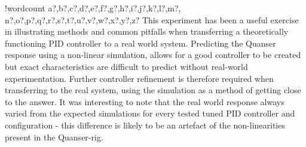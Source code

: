 \documentclass[11pt]{article}
\newcounter{words}
\newenvironment{counted}{%
  \setcounter{words}{0}
  \SearchList!{wordcount}{\stepcounter{words}}
    {a?,b?,c?,d?,e?,f?,g?,h?,i?,j?,k?,l?,m?,
    n?,o?,p?,q?,r?,s?,t?,u?,v?,w?,x?,y?,z?}
  \UndoBoundary{'}
  \SearchOrder{p;}}{%
  \StopSearching}
\begin{document}
\begin{counted}
This experiment has been a useful exercise in illustrating methods and
common pitfalls when transferring a theoretically functioning PID
controller to a real world system. Predicting the Quanser response using
a non-linear simulation, allows for a good controller to be created but
exact characteristics are difficult to predict without real-world
experimentation. Further controller refinement is therefore required
when transferring to the real system, using the simulation as a method
of getting close to the answer. It was interesting to note that the real
world response always varied from the expected simulations for every
tested tuned PID controller and configuration - this difference is
likely to be an artefact of the non-linearities present in the
Quanser-rig.

\end{counted} %


% 

\printbibliography
\end{document}
